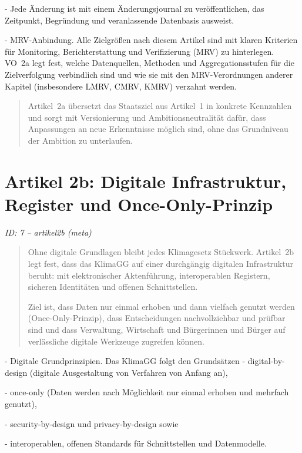 \documentclass[12pt,a4paper]{scrartcl}
\begin{document}
- Jede Änderung ist mit einem Änderungsjournal zu veröffentlichen, das Zeitpunkt, Begründung und veranlassende Datenbasis ausweist.

- MRV-Anbindung. Alle Zielgrößen nach diesem Artikel sind mit klaren Kriterien für Monitoring, Berichterstattung und Verifizierung (MRV) zu hinterlegen. VO 2a legt fest, welche Datenquellen, Methoden und Aggregationsstufen für die Zielverfolgung verbindlich sind und wie sie mit den MRV-Verordnungen anderer Kapitel (insbesondere LMRV, CMRV, KMRV) verzahnt werden.

{\footnotesize\begin{quote}
Artikel 2a übersetzt das Staatsziel aus Artikel 1 in konkrete Kennzahlen und sorgt mit Versionierung und Ambitionsneutralität dafür, dass Anpassungen an neue Erkenntnisse möglich sind, ohne das Grundniveau der Ambition zu unterlaufen.
\end{quote}}



\section[Artikel 2b: Digitale Infrastruktur, Register und Once-Only-Prinzip]{Artikel 2b: Digitale Infrastruktur, Register und Once-Only-Prinzip}
\noindent\textit{ID: 7 -- artikel2b (meta)}

\begin{quote}
Ohne digitale Grundlagen bleibt jedes Klimagesetz Stückwerk. Artikel 2b legt fest, dass das KlimaGG auf einer durchgängig digitalen Infrastruktur beruht: mit elektronischer Aktenführung, interoperablen Registern, sicheren Identitäten und offenen Schnittstellen.

Ziel ist, dass Daten nur einmal erhoben und dann vielfach genutzt werden (Once-Only-Prinzip), dass Entscheidungen nachvollziehbar und prüfbar sind und dass Verwaltung, Wirtschaft und Bürgerinnen und Bürger auf verlässliche digitale Werkzeuge zugreifen können.
\end{quote}

- Digitale Grundprinzipien. Das KlimaGG folgt den Grundsätzen
- digital-by-design (digitale Ausgestaltung von Verfahren von Anfang an),

- once-only (Daten werden nach Möglichkeit nur einmal erhoben und mehrfach genutzt),

- security-by-design und privacy-by-design sowie

- interoperablen, offenen Standards für Schnittstellen und Datenmodelle.
\end{document}
